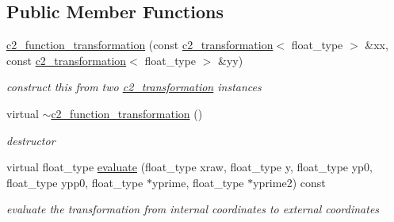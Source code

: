 \subsection*{Public Member Functions}
\begin{DoxyCompactItemize}
\item 
\hyperlink{classc2__function__transformation_a26fa71708edcb8b669b34daea6e9ea79}{c2\+\_\+function\+\_\+transformation} (const \hyperlink{classc2__transformation}{c2\+\_\+transformation}$<$ float\+\_\+type $>$ \&xx, const \hyperlink{classc2__transformation}{c2\+\_\+transformation}$<$ float\+\_\+type $>$ \&yy)
\begin{DoxyCompactList}\small\item\em construct this from two \hyperlink{classc2__transformation}{c2\+\_\+transformation} instances \end{DoxyCompactList}\item 
virtual \hyperlink{classc2__function__transformation_ab7cd7a2df0c12d4ce25f2e8a415383ad}{$\sim$c2\+\_\+function\+\_\+transformation} ()
\begin{DoxyCompactList}\small\item\em destructor \end{DoxyCompactList}\item 
virtual float\+\_\+type \hyperlink{classc2__function__transformation_a7089747852a044a4a6a9884fadecf871}{evaluate} (float\+\_\+type xraw, float\+\_\+type y, float\+\_\+type yp0, float\+\_\+type ypp0, float\+\_\+type $\ast$yprime, float\+\_\+type $\ast$yprime2) const 
\begin{DoxyCompactList}\small\item\em evaluate the transformation from internal coordinates to external coordinates \end{DoxyCompactList}\end{DoxyCompactItemize}
